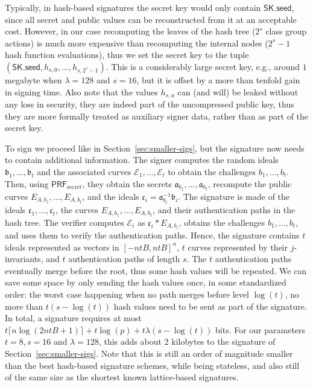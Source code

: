 \documentclass{llncs}
\newcommand{\E}{\mathcal{E}}
\newcommand{\seed}{\mathsf{seed}}
\newcommand{\SK}{\mathsf{SK}}
\renewcommand{\a}{\mathfrak{a}}
\renewcommand{\b}{\mathfrak{b}}
\renewcommand{\c}{\mathfrak{c}}
\newcommand{\PRF}{\mathsf{PRF}}
\newcommand{\PRFs}{\PRF_{\mathrm{secret}}}
\begin{document}
Typically, in hash-based signatures the secret key would only contain $\SK.\seed$, since all secret and public values can be reconstructed from it at an acceptable cost.
However, in our case recomputing the leaves of the hash tree ($2^s$ class group actions) is much more expensive than recomputing the internal nodes ($2^s-1$ hash function evaluations), thus we set the secret key to the tuple $(\SK.\seed,h_{s,0},\dots,h_{s,2^s-1})$.
This is a considerably large secret key, e.g., around $1$ megabyte when $\lambda=128$ and $s=16$, but it is offset by a more than tenfold gain in signing time.
Also note that the values $h_{s,u}$ can (and will) be leaked without any loss in security, they are indeed part of the uncompressed public key, thus they are more formally treated as auxiliary signer data, rather than as part of the secret key.

To sign we proceed like in Section~\ref{sec:smaller-sigs}, but the signature now needs to contain additional information.
The signer computes the random ideals $\b_1,\dots,\b_t$ and the associated curves $\E_1,\dots,\E_t$ to obtain the challenges $b_1,\dots,b_t$.
Then, using $\PRFs$, they obtain the secrets $\a_{b_1},\dots,\a_{b_t}$, recompute the public curves $E_{A,b_1},\dots,E_{A,b_t}$, and the ideals $\c_i=\a_{b_i}^{-1}\b_i$.
The signature is made of the ideals $\c_1,\dots,\c_t$, the curves $E_{A,b_1},\dots,E_{A,b_t}$, and their authentication paths in the hash tree.
The verifier computes $\E_i$ as $\c_i * E_{A,b_i}$, obtains the challenges $b_1,\dots,b_t$, and uses them to verify the authentication paths.
Hence, the signature contains $t$ ideals represented as vectors in $[-ntB,ntB]^n$, $t$ curves represented by their $j$-invariants, and $t$ authentication paths of length $s$.
The $t$ authentication paths eventually merge before the root, thus some hash values will be repeated.
We can save some space by only sending the hash values once, in some standardized order: the worst case happening when no path merges before level $\log(t)$, no more than $t(s-\log(t))$ hash values need to be sent as part of the signature.
In total, a signature requires at most $t\lceil n \log(2ntB+1)\rceil + t\log(p) + t\lambda(s-\log(t))$ bits.
For our parameters $t=8, s=16$ and $\lambda=128$, this adds about 2 kilobytes to the signature of Section~\ref{sec:smaller-sigs}.
Note that this is still an order of magnitude smaller than the best hash-based signature schemes, while being stateless, and also still of the same size as the shortest known lattice-based signatures.
\end{document}
